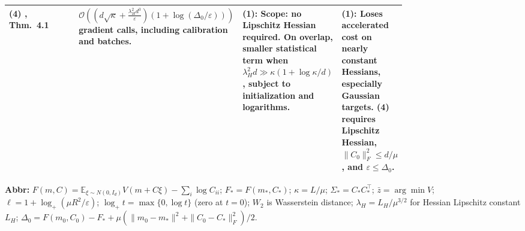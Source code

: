 \begin{table}[tp]
\begin{threeparttable}
\begin{tabularx}{\linewidth}{@{}>{\raggedright\arraybackslash}p{0.20\linewidth}>{\raggedright\arraybackslash}p{0.32\linewidth}>{\raggedright\arraybackslash}p{0.25\linewidth}>{\raggedright\arraybackslash}X@{}}
\midrule
\textbf{(4)} \citep{gviPark2026v1}, Thm.~4.1 & $\mathcal{O}\!\left(\left(d\sqrt\kappa+\frac{\lambda_H^2d^3}{\varepsilon}\right)(1+\log(\Delta_0/\varepsilon))\right)$ gradient calls, including calibration and batches. & \textbf{(1)}: Scope: no Lipschitz Hessian required. On overlap, smaller statistical term when $\lambda_H^2d\gg\kappa(1+\log\kappa/d)$, subject to initialization and logarithms. & \textbf{(1)}: Loses accelerated cost on nearly constant Hessians, especially Gaussian targets. \textbf{(4)} requires Lipschitz Hessian, $\|C_0\|_F^2\le d/\mu$, and $\varepsilon\le\Delta_0$. \\
\bottomrule
\end{tabularx}
\begin{tablenotes}[flushleft]\footnotesize
\item[] \textbf{Abbr:} $F(m,C)=\mathbb E_{\xi\sim N(0,I_d)}V(m+C\xi)-\sum_i\log C_{ii}$; $F_*=F(m_*,C_*)$; $\kappa=L/\mu$; $\Sigma_*=C_*C_*^\top$; $\bar z=\arg\min V$; $\ell=1+\log_+(\mu R^2/\varepsilon)$; $\log_+t=\max\{0,\log t\}$ (zero at $t=0$); $W_2$ is Wasserstein distance; $\lambda_H=L_H/\mu^{3/2}$ for Hessian Lipschitz constant $L_H$; $\Delta_0=F(m_0,C_0)-F_*+\mu(\|m_0-m_*\|^2+\|C_0-C_*\|_F^2)/2$.
\end{tablenotes}
\end{threeparttable}
\end{table}
\clearpage
